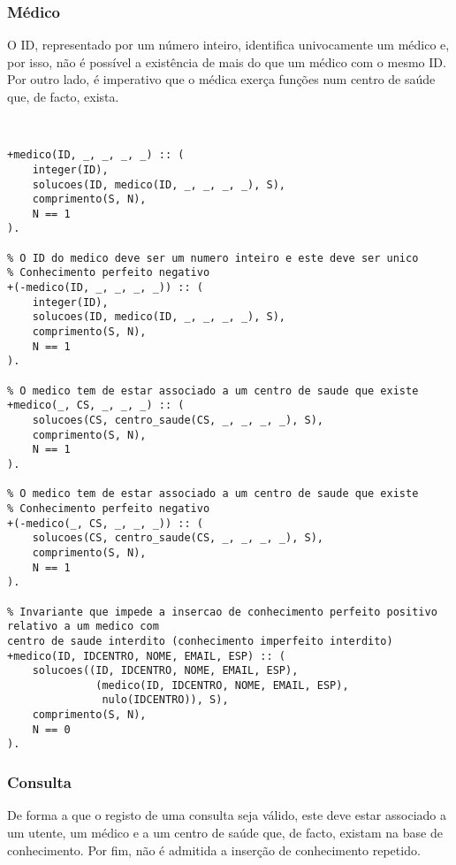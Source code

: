 \pagebreak

\subsubsection*{Médico}
O ID, representado por um número inteiro, identifica univocamente um médico e, por isso, não é 
possível a existência de
mais do que um médico com o mesmo ID. Por outro lado, é imperativo que o médica exerça 
funções num centro de saúde que,
de facto, exista.

\

\begin{lstlisting}[caption={Invariantes de inserção relativos ao predicado \texttt{medico}}]
% O ID do medico deve ser um numero inteiro e este deve ser unico
+medico(ID, _, _, _, _) :: (
    integer(ID),
    solucoes(ID, medico(ID, _, _, _, _), S),
    comprimento(S, N),
    N == 1
).

% O ID do medico deve ser um numero inteiro e este deve ser unico
% Conhecimento perfeito negativo
+(-medico(ID, _, _, _, _)) :: (
    integer(ID),
    solucoes(ID, medico(ID, _, _, _, _), S),
    comprimento(S, N),
    N == 1
).

% O medico tem de estar associado a um centro de saude que existe
+medico(_, CS, _, _, _) :: (
    solucoes(CS, centro_saude(CS, _, _, _, _), S),
    comprimento(S, N),
    N == 1
).

% O medico tem de estar associado a um centro de saude que existe
% Conhecimento perfeito negativo
+(-medico(_, CS, _, _, _)) :: (
    solucoes(CS, centro_saude(CS, _, _, _, _), S),
    comprimento(S, N),
    N == 1
).

% Invariante que impede a insercao de conhecimento perfeito positivo relativo a um medico com 
centro de saude interdito (conhecimento imperfeito interdito)
+medico(ID, IDCENTRO, NOME, EMAIL, ESP) :: (
    solucoes((ID, IDCENTRO, NOME, EMAIL, ESP),
              (medico(ID, IDCENTRO, NOME, EMAIL, ESP),
               nulo(IDCENTRO)), S),
    comprimento(S, N),
    N == 0
).

\end{lstlisting}

\subsubsection*{Consulta}
De forma a que o registo de uma consulta seja válido, este deve estar associado a um utente, um 
médico e a um centro de
saúde que, de facto, existam na base de conhecimento. Por fim, não é admitida a inserção de 
conhecimento repetido.

